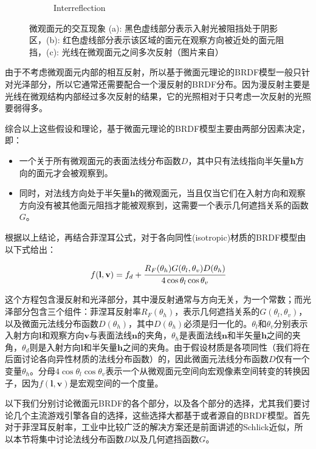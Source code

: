 \begin{figure}
\begin{subfigure}[b]{0.283\textwidth}
		\caption{Interreflection}
	\end{subfigure}
\caption{微观面元的交互现象 (a): 黑色虚线部分表示入射光被阻挡处于阴影区，(b): 红色虚线部分表示该区域的面元在观察方向被近处的面元阻挡，(c): 光线在微观面元之间多次反射（图片来自\cite{b:rtr}）}
\label{f:intro-microfacet-effect}
\end{figure}

由于不考虑微观面元内部的相互反射，所以基于微面元理论的BRDF模型一般只针对光泽部分，所以它通常还需要配合一个漫反射的BRDF分布。因为漫反射主要是光线在微观结构内部经过多次反射的结果，它的光照相对于只考虑一次反射的光照要弱得多。


综合以上这些假设和理论，基于微面元理论的BRDF模型主要由两部分因素决定，即：

\begin{itemize}
	\item 一个关于所有微观面元的表面法线分布函数$D$，其中只有法线指向半矢量$\mathbf{h}$方向的面元才会被观察到。
	\item 同时，对法线方向处于半矢量$\mathbf{h}$的微观面元，当且仅当它们在入射方向和观察方向没有被其他面元阻挡才能被观察到，这需要一个表示几何遮挡关系的函数$G$。
\end{itemize}

根据以上结论，再结合菲涅耳公式，对于各向同性(isotropic)材质的BRDF模型由以下式给出：

\begin{equation}
	f(\mathbf{l},\mathbf{v})=f_d+ \cfrac{R_F(\theta_h)G(\theta_l,\theta_v)D(\theta_h)}{4\cos\theta_l \cos\theta_v}
\end{equation}

\noindent 这个方程包含漫反射和光泽部分，其中漫反射通常与方向无关，为一个常数；而光泽部分包含三个组件：菲涅耳反射率$R_F(\theta_h)$，表示几何遮挡关系的$G(\theta_l,\theta_v)$，以及微面元法线分布函数$D(\theta_h)$，其中$D(\theta_h)$必须是归一化的。$\theta_l$和$\theta_v$分别表示入射方向$\mathbf{l}$和观察方向$\mathbf{v}$与表面法线$\mathbf{n}$的夹角，$\theta_h$是表面法线$\mathbf{n}$和半矢量$\mathbf{h}$之间的夹角，$\theta_d$则是入射方向$\mathbf{l}$和半矢量$\mathbf{h}$之间的夹角。由于假设材质是各项同性（我们将在后面讨论各向异性材质的法线分布函数）的，因此微面元法线分布函数$D$仅有一个变量$\theta_h$。分母$4\cos\theta_l \cos\theta_v$表示一个从微观面元空间向宏观像素空间转变的转换因子，因为$f(\mathbf{l},\mathbf{v})$是宏观空间的一个度量。


以下我们分别讨论微面元BRDF的各个部分，以及各个部分的选择，尤其我们要讨论几个主流游戏引擎各自的选择，这些选择大都基于或者源自\cite{a:PhysicallyBasedShadingatDisney}的BRDF模型。首先对于菲涅耳反射率，工业中比较广泛的解决方案还是前面讲述的Schlick近似，所以本节将集中讨论法线分布函数$D$以及几何遮挡函数$G$。



